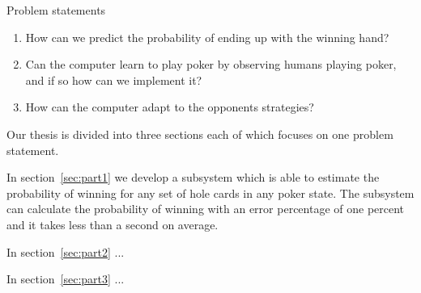 \vspace{4mm}
\begin{statementBox2}{Problem statements}
\begin{enumerate}
    \item \label{itm:q1} How can we predict the probability of ending up with the winning hand? 
    \item \label{itm:q2} Can the computer learn to play poker by observing humans playing poker, and if so how can we implement it? 
    \item \label{itm:q3} How can the computer adapt to the opponents strategies?
  \end{enumerate}
\end{statementBox2}
\vspace{4mm}

Our thesis is divided into three sections each of which focuses on one problem statement.

In section~\ref{sec:part1} we develop a subsystem which is able to estimate the probability of winning for any set of hole cards in any poker state. The subsystem can calculate the probability of winning with an error percentage of one percent and it takes less than a second on average.

In section~\ref{sec:part2} ...

In section~\ref{sec:part3} ...
